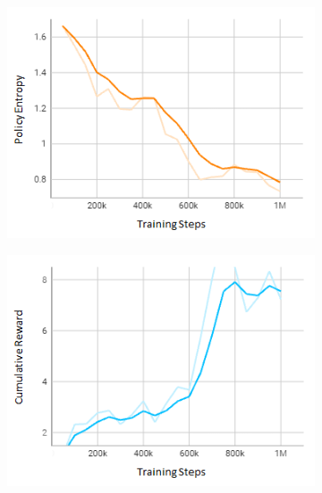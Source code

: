 \documentclass[letterpaper, 10 pt, conference]{ieeeconf}  %
\begin{document}
\begin{figure}[t]
\begin{subfigure}[b]{0.16\linewidth}
			\includegraphics[width=\linewidth]{Fig5c.png}
			\caption{}
			\label{fig5c}
		\end{subfigure}
		\hfill
		\begin{subfigure}[b]{0.16\linewidth}
			\centering
			\includegraphics[width=\linewidth]{Fig5d.png}
			\caption{}
			\label{fig5d}
		\end{subfigure}
		\hfill
		\begin{subfigure}[b]{0.16\linewidth}
			\centering

\end{subfigure}
\end{figure}
\end{document}
